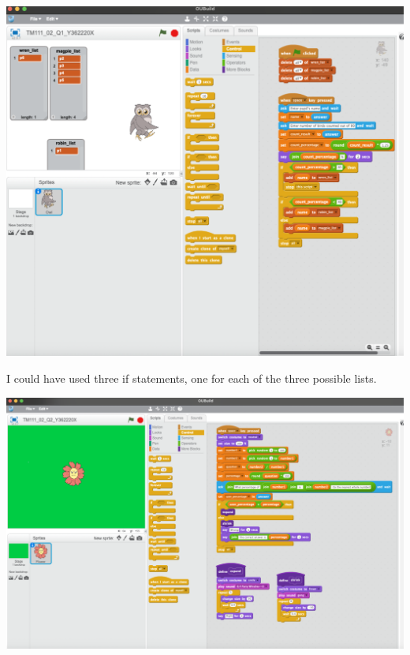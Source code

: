 \documentclass{article}
\begin{document}
\begin{question}
\includegraphics[scale=0.25]{question_1_d.png}

\qsubpart

I could have used three if statements, one for each of the three possible lists.

\end{question}

\begin{question}

  \qpart

  \includegraphics[scale=0.25]{question_2_a.png}

  \qpart


\end{question}
\end{document}
